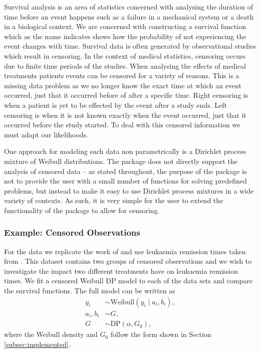 \documentclass[nojss]{jss}
\begin{document}
Survival analysis is an area of statistics concerned with analysing the duration of time before an event happens such as a failure in a mechanical system or a death in a biological context. We are concerned with constructing a survival function which as the name indicates shows how the probability of not experiencing the event changes with time. Survival data is often generated by observational studies which result in censoring. In the context of medical statistics, censoring occurs due to finite time periods of the studies. When analysing the effects of medical treatments patients events can be censored for a variety of reasons. This is a missing data problem as we no longer know the exact time at which an event occurred, just that it occurred before of after a specific time. Right censoring is when a patient is yet to be effected by the event after a study ends. Left censoring is when it is not known exactly when the event occurred, just that it occurred before the study started. To deal with this censored information we must adapt our likelihoods.

One approach for modeling such data non parametrically is a Dirichlet process mixture of Weibull distributions. The  package does not directly support the analysis of censored data -- as stated throughout, the purpose of the package is not to provide the user with a small number of functions for solving predefined problems, but instead to make it easy to use Dirichlet process mixtures in a wide variety of contexts. As such, it is very simple for the user to extend the functionality of the package to allow for censoring.

\subsubsection{Example: Censored Observations}

For the data we replicate the work of \cite{kottas_nonparametric_2006} and use leukaemia remission times taken from \cite{lawless_statistical_2011}. This dataset contains two groups of censored observations and we wish to investigate the impact two different treatments have on leukaemia remission times. We fit a censored Weibull DP model to each of the data sets and compare the survival functions. The full model can be written as
\begin{align*}
y _i & \sim \text{Weibull} ( y_i \mid a_i , b_i ), \\
a_i , b_i & \sim G, \\
G & \sim  \text{DP} (\alpha , G_0),
\end{align*}
where the Weibull density and $G_0$ follow the form shown in Section \ref{subsec:implemented}.
\end{document}
